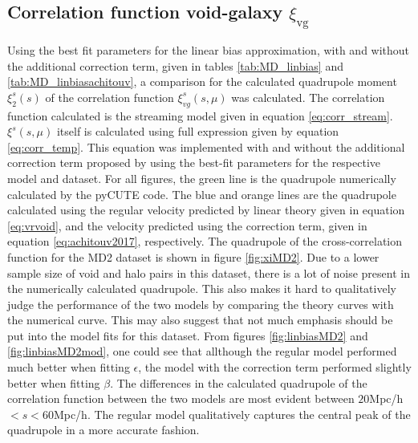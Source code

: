 \subsection{Correlation function void-galaxy $\xi_{\mathrm{vg}}$}
Using the best fit parameters for the linear bias approximation, with and without the additional correction term, given in tables \ref{tab:MD_linbias} and \ref{tab:MD_linbiasachitouv}, a comparison for the calculated quadrupole moment $\xi_2^s(s)$ of the correlation function $\xi_{vg}^s(s,\mu)$ was calculated. The correlation function calculated is the streaming model given in equation \ref{eq:corr_stream}. $\xi^s(s,\mu)$ itself is calculated using full expression given by equation \ref{eq:corr_temp}. This equation was implemented with and without the additional correction term proposed by \cite{Achitouv_streaming} using the best-fit parameters for the respective model and dataset. For all figures, the green line is the quadrupole numerically calculated by the pyCUTE code. The blue and orange lines are the quadrupole calculated using the regular velocity predicted by linear theory given in equation \ref{eq:vrvoid}, and the velocity predicted using the correction term, given in equation \ref{eq:achitouv2017}, respectively. The quadrupole of the cross-correlation function for the MD2 dataset is shown in figure \ref{fig:xiMD2}. Due to a lower sample size of void and halo pairs in this dataset, there is a lot of noise present in the numerically calculated quadrupole. This also makes it hard to qualitatively judge the performance of the two models by comparing the theory curves with the numerical curve. This may also suggest that not much emphasis should be put into the model fits for this dataset. From figures \ref{fig:linbiasMD2} and \ref{fig:linbiasMD2mod}, one could see that allthough the regular model performed much better when fitting $\epsilon$, the model with the correction term performed slightly better when fitting $\beta$. The differences in the calculated quadrupole of the correlation function between the two models are most evident between $20$Mpc/h$<s<60$Mpc/h. The regular model qualitatively captures the central peak of the quadrupole in a more accurate fashion.\\\indent

